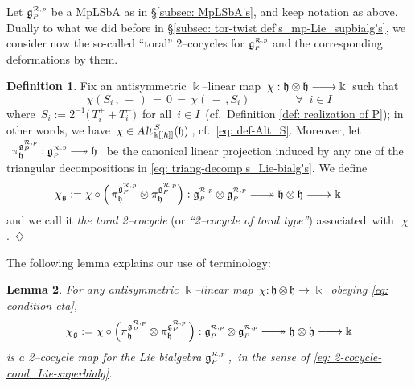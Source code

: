\documentclass[12pt,reqno,twoside,a4paper]{amsart}
\numberwithin{equation}{section}
\newtheorem{lema}{Lemma}[subsection]
\theoremstyle{definition}
\newtheorem{definition}[lema]{Definition}
\newtheorem{free text}[lema]{}
\theoremstyle{remark}
\def \kh{{\Bbbk[[\hbar]]}}
\def \Ppicc {{\scriptscriptstyle P}}
\def \lieg{\mathfrak{g}}
\def \liegRpP{\mathfrak{g}^{\raise1pt\hbox{$ \scriptscriptstyle \mathcal{R},p $}}_\Ppicc}
\def \lieh{\mathfrak{h}}
\theoremstyle{plain}
\begin{document}
\vskip7pt

   Let $ \liegRpP $  be a MpLSbA as in  \S \ref{subsec: MpLSbA's},
   and keep notation as above.  Dually to what we did before in
   \S \ref{subsec: tor-twist def's_mp-Lie_supbialg's},  we consider now the so-called
   ``toral'' 2--cocycles for  $ \liegRpP $  and the corresponding deformations by them.

\vskip9pt

\begin{definition}  \label{def: toral_2-cocyc x MpLbA's}
%
 Fix an antisymmetric  $ \Bbbk $--linear  map  $ \, \chi : \lieh \otimes \lieh \relbar\joinrel\longrightarrow \Bbbk \, $
 such that
%
\begin{equation}  \label{eq: condition-eta}
  \chi(S_i \, ,\,-\,)  \, = \,  0  \, = \,  \chi(\,-\,,S_i)
  \qquad \qquad \forall \;\; i \in I
%
\end{equation}
%
 where  $ \, S_i := 2^{-1} \big(\, T^+_i + T^-_i \big) \, $
 for all  $ \, i \in I \, $  (cf.\ Definition \ref{def: realization of P});
 in other words, we have  $ \, \chi \in \text{\sl Alt}_{\,\kh}^{\,S}(\lieh) \, $,  cf.\ \eqref{eq: def-Alt_S}.
 Moreover, let
%
 $ \,\; \pi^{\liegRpP}_\lieh : \liegRpP \relbar\joinrel\twoheadrightarrow \lieh \;\, $
%
 be the canonical linear projection induced by any one of the triangular
 decompositions in
 \eqref{eq: triang-decomp's_Lie-bialg's}.  We define
%
  $$
  \chi_\lieg := \chi  \circ \Big(\, \pi^{\liegRpP}_\lieh \otimes \pi^{\liegRpP}_\lieh \Big) :
  \liegRpP \otimes \liegRpP \relbar\joinrel\relbar\joinrel\twoheadrightarrow
  \lieh \otimes \lieh
  \relbar\joinrel\longrightarrow \Bbbk   \qquad
  $$
%
 and we call it  \textit{the toral 2--cocycle\/}
 (or  \textit{``2--cocycle  of toral type''\/})
 \hbox{associated with  $ \, \chi \, $.   \hfill  $ \diamondsuit $}
%
\end{definition}

\vskip9pt

   The following lemma explains our use of terminology:

\vskip11pt

\begin{lema}  \label{lemma: toral 2-cocyc x MpLbA's}
%
 For any  antisymmetric
 $ \Bbbk $--linear  map  $ \, \chi : \lieh \otimes \lieh \longrightarrow \Bbbk \, $  obeying  \eqref{eq: condition-eta},
  $$  \chi_\lieg := \chi \circ \Big( \pi^{\liegRpP}_\lieh \otimes \pi^{\liegRpP}_\lieh \,\Big) : \liegRpP
  \otimes \liegRpP \relbar\joinrel\relbar\joinrel\twoheadrightarrow \lieh \otimes \lieh \relbar\joinrel\longrightarrow \Bbbk  $$
%
 is a  \textsl{2--cocycle\/}  map for the Lie bialgebra  $ \liegRpP \, $,  \,in the sense of  \eqref{eq: 2-cocycle-cond_Lie-superbialg}.
%
\end{lema}
\end{document}
